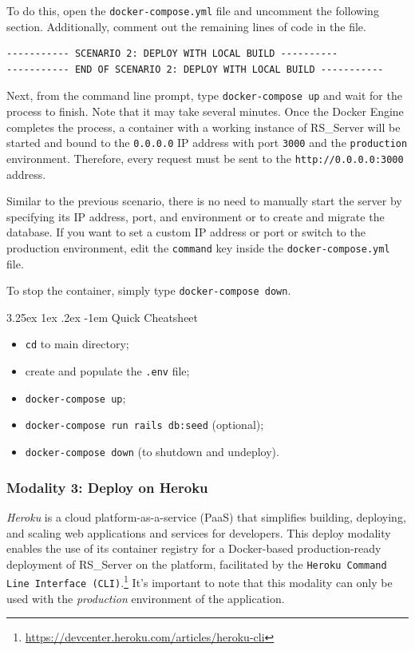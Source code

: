 \documentclass[a4paper, english]{article}
\makeatletter
\renewcommand\paragraph{\@startsection{paragraph}{5}{\z@}%
  {3.25ex \@plus1ex \@minus.2ex}%
  {-1em}%
  {\normalfont\normalsize\bfseries}}
\newcommand{\rsserver}{RS\_Server\xspace}
\makeatother
\begin{document}
To do this, open the \verb|docker-compose.yml| file and uncomment the following section. 
Additionally, comment out the remaining lines of code in the file.
\begin{verbatim}
----------- SCENARIO 2: DEPLOY WITH LOCAL BUILD ----------
----------- END OF SCENARIO 2: DEPLOY WITH LOCAL BUILD -----------
\end{verbatim} 

Next, from the command line prompt, type \verb|docker-compose up| and wait for the process to finish. Note that it may take several minutes. 
Once the Docker Engine completes the process, a container with a working instance of \rsserver will be started and bound to the \verb|0.0.0.0| 
IP address with port \verb|3000| and the \verb|production| environment. Therefore, every request must be sent to the \verb|http://0.0.0.0:3000| address.

Similar to the previous scenario, there is no need to manually start the server by specifying its IP address, port, and environment or to create and migrate the database. If you want to set a custom IP address or port or switch to the production environment, edit the \verb|command| key inside the \verb|docker-compose.yml| file.

To stop the container, simply type \verb|docker-compose down|.

\paragraph{Quick Cheatsheet}

\begin{itemize}
\item \verb|cd| to main directory;
\item create and populate the \verb|.env| file;
\item \verb|docker-compose up|;
\item \verb|docker-compose run rails db:seed| (optional);
\item \verb|docker-compose down| (to shutdown and undeploy).
\end{itemize}

\subsubsection{Modality 3: Deploy on Heroku}

\label{modality:3}

\emph{Heroku} is a cloud platform-as-a-service (PaaS) that simplifies building, deploying, and scaling web applications and services for developers. This deploy modality enables the use of its container registry for a Docker-based production-ready deployment of \rsserver on the platform, facilitated by the \verb|Heroku Command Line Interface (CLI)|.\footnote{\url{https://devcenter.heroku.com/articles/heroku-cli}} It's important to note that this modality can only be used with the \emph{production} environment of the application.
\end{document}
